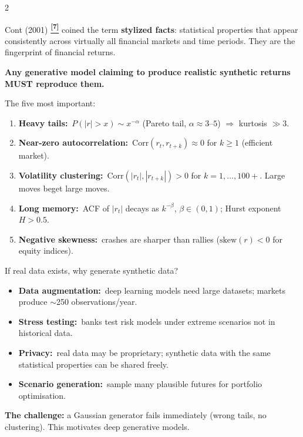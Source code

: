 \documentclass[10pt]{article}
\newcommand{\tealbox}[2]{\begin{tcolorbox}[mybox={Teal}{LBg},title={#1}]#2\end{tcolorbox}}
\newcommand{\purplebox}[2]{\begin{tcolorbox}[mybox={Purple}{LBg},title={#1}]#2\end{tcolorbox}}
\newcommand{\tcite}[1]{%
  \hyperlink{R:#1}{\textsuperscript{\scriptsize\textbf{[#1]}}}}
\begin{document}
\begin{multicols}{2}
\columnbreak

\tealbox{What Are Stylized Facts?}{%
Cont (2001)\tcite{7} coined the term \textbf{stylized facts}: statistical properties that appear consistently across virtually all financial markets and time periods. They are the fingerprint of financial returns.

\textbf{Any generative model claiming to produce realistic synthetic returns MUST reproduce them.}

The five most important:
\begin{enumerate}
  \item \textbf{Heavy tails:}\ $P(|r|>x) \sim x^{-\alpha}$ (Pareto tail, $\alpha \approx 3$--$5$) $\Rightarrow$ kurtosis $\gg 3$.
  \item \textbf{Near-zero autocorrelation:}\ $\text{Corr}(r_t, r_{t+k}) \approx 0$ for $k \geq 1$ (efficient market).
  \item \textbf{Volatility clustering:}\ $\text{Corr}(|r_t|, |r_{t+k}|) > 0$ for $k = 1,\ldots,100+$. Large moves beget large moves.
  \item \textbf{Long memory:}\ ACF of $|r_t|$ decays as $k^{-\beta}$, $\beta \in (0,1)$; Hurst exponent $H > 0.5$.
  \item \textbf{Negative skewness:}\ crashes are sharper than rallies ($\text{skew}(r) < 0$ for equity indices).
\end{enumerate}}

\purplebox{Why Generate Synthetic Data?}{%
If real data exists, why generate synthetic data?
\begin{itemize}
  \item \textbf{Data augmentation:}\ deep learning models need large datasets; markets produce $\sim$250 observations/year.
  \item \textbf{Stress testing:}\ banks test risk models under extreme scenarios not in historical data.
  \item \textbf{Privacy:}\ real data may be proprietary; synthetic data with the same statistical properties can be shared freely.
  \item \textbf{Scenario generation:}\ sample many plausible futures for portfolio optimisation.
\end{itemize}
\textbf{The challenge:} a Gaussian generator fails immediately (wrong tails, no clustering). This motivates deep generative models.}

\end{multicols}

\clearpage
\end{document}
